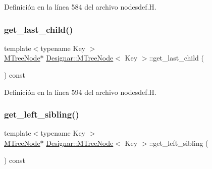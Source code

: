Definición en la línea 584 del archivo nodesdef.\+H.

\mbox{\label{class_designar_1_1_m_tree_node_a6b2089185feed25ae434f46584b83ffc}} 
\subsubsection{\texorpdfstring{get\+\_\+last\+\_\+child()}{get\_last\_child()}}
{\footnotesize\ttfamily template$<$typename Key $>$ \\
\hyperlink{class_designar_1_1_m_tree_node}{M\+Tree\+Node}$\ast$ \hyperlink{class_designar_1_1_m_tree_node}{Designar\+::\+M\+Tree\+Node}$<$ Key $>$\+::get\+\_\+last\+\_\+child (\begin{DoxyParamCaption}{ }\end{DoxyParamCaption}) const\hspace{0.3cm}{\ttfamily [inline]}}



Definición en la línea 594 del archivo nodesdef.\+H.

\mbox{\label{class_designar_1_1_m_tree_node_a10ec8a3f078b1f3d63773ca16602719c}} 
\subsubsection{\texorpdfstring{get\+\_\+left\+\_\+sibling()}{get\_left\_sibling()}}
{\footnotesize\ttfamily template$<$typename Key $>$ \\
\hyperlink{class_designar_1_1_m_tree_node}{M\+Tree\+Node}$\ast$ \hyperlink{class_designar_1_1_m_tree_node}{Designar\+::\+M\+Tree\+Node}$<$ Key $>$\+::get\+\_\+left\+\_\+sibling (\begin{DoxyParamCaption}{ }\end{DoxyParamCaption}) const\hspace{0.3cm}{\ttfamily [inline]}}




